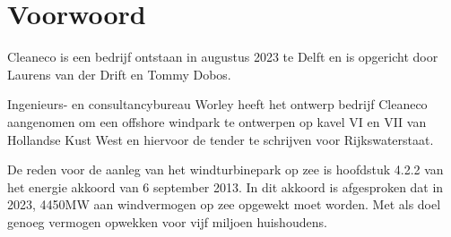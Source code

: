 \section{Voorwoord}
Cleaneco is een bedrijf ontstaan in augustus 2023 te Delft en is opgericht door Laurens van der Drift en Tommy Dobos.

Ingenieurs- en consultancybureau Worley heeft het ontwerp bedrijf Cleaneco aangenomen om een \gls{offshore} windpark te ontwerpen op kavel VI en VII van Hollandse Kust West en hiervoor de \gls{tender} te schrijven voor Rijkswaterstaat. 

De reden voor de aanleg van het windturbinepark op zee is hoofdstuk 4.2.2 van het \gls{energie akkoord}\cite{energieakkoord} van 6 september 2013. In dit akkoord is afgesproken dat in 2023, 4450MW aan windvermogen op zee opgewekt moet worden. Met als doel genoeg vermogen opwekken voor vijf miljoen huishoudens. 
